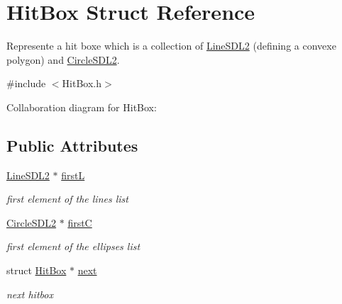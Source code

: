 \hypertarget{structHitBox}{}\section{Hit\+Box Struct Reference}
\label{structHitBox}


Represente a hit boxe which is a collection of \hyperlink{structLineSDL2}{Line\+S\+D\+L2} (defining a convexe polygon) and \hyperlink{structCircleSDL2}{Circle\+S\+D\+L2}.  




{\ttfamily \#include $<$Hit\+Box.\+h$>$}



Collaboration diagram for Hit\+Box\+:
\subsection*{Public Attributes}
\begin{DoxyCompactItemize}
\item 
\hyperlink{structLineSDL2}{Line\+S\+D\+L2} $\ast$ \hyperlink{structHitBox_a3f8b8bd82cf7afe309b505e17151fe00}{firstL}\hypertarget{structHitBox_a3f8b8bd82cf7afe309b505e17151fe00}{}\label{structHitBox_a3f8b8bd82cf7afe309b505e17151fe00}

\begin{DoxyCompactList}\small\item\em first element of the lines\textquotesingle{} list \end{DoxyCompactList}\item 
\hyperlink{structCircleSDL2}{Circle\+S\+D\+L2} $\ast$ \hyperlink{structHitBox_ab66b0a9156c3fedd495f11c65462b128}{firstC}\hypertarget{structHitBox_ab66b0a9156c3fedd495f11c65462b128}{}\label{structHitBox_ab66b0a9156c3fedd495f11c65462b128}

\begin{DoxyCompactList}\small\item\em first element of the ellipses\textquotesingle{} list \end{DoxyCompactList}\item 
struct \hyperlink{structHitBox}{Hit\+Box} $\ast$ \hyperlink{structHitBox_a2009d8cf7256da486ceebcd8213c9708}{next}\hypertarget{structHitBox_a2009d8cf7256da486ceebcd8213c9708}{}\label{structHitBox_a2009d8cf7256da486ceebcd8213c9708}

\begin{DoxyCompactList}\small\item\em next hitbox \end{DoxyCompactList}\end{DoxyCompactItemize}


